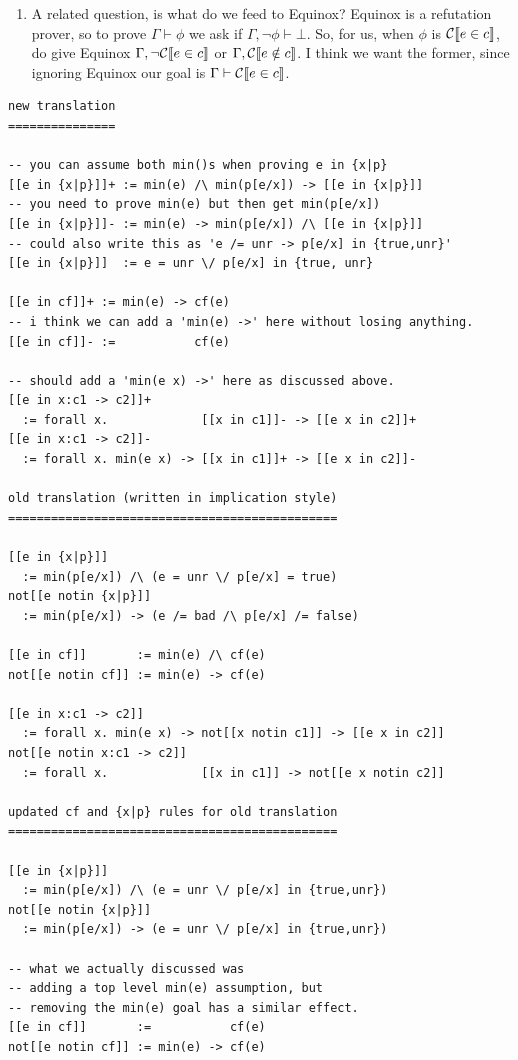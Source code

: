 \documentclass[preprint]{sigplanconf}
\begin{document}
{\begin{enumerate}
\item A related question, is what do we feed to Equinox?  Equinox is a 
  refutation prover, so to prove $\Gamma \vdash \phi$ we ask if 
  $\Gamma,\lnot \phi \vdash \bot$.  So, for us, when $\phi$ is $\mathcal{C} \llbracket e \in c \rrbracket$, do
  give Equinox $\Gamma,\lnot \mathcal{C} \llbracket e \in c \rrbracket$ or $\Gamma, \mathcal{C} \llbracket e \notin c \rrbracket$.  I think
  we want the former, since ignoring Equinox our goal is $\Gamma \vdash \mathcal{C} \llbracket e \in c \rrbracket$.
\end{enumerate}
}

\small
\begin{verbatim}
new translation
===============

-- you can assume both min()s when proving e in {x|p} 
[[e in {x|p}]]+ := min(e) /\ min(p[e/x]) -> [[e in {x|p}]]
-- you need to prove min(e) but then get min(p[e/x])
[[e in {x|p}]]- := min(e) -> min(p[e/x]) /\ [[e in {x|p}]]
-- could also write this as 'e /= unr -> p[e/x] in {true,unr}'
[[e in {x|p}]]  := e = unr \/ p[e/x] in {true, unr}

[[e in cf]]+ := min(e) -> cf(e)
-- i think we can add a 'min(e) ->' here without losing anything.
[[e in cf]]- :=           cf(e)

-- should add a 'min(e x) ->' here as discussed above.
[[e in x:c1 -> c2]]+
  := forall x.             [[x in c1]]- -> [[e x in c2]]+   
[[e in x:c1 -> c2]]-
  := forall x. min(e x) -> [[x in c1]]+ -> [[e x in c2]]-

old translation (written in implication style)
==============================================

[[e in {x|p}]]       
  := min(p[e/x]) /\ (e = unr \/ p[e/x] = true)
not[[e notin {x|p}]] 
  := min(p[e/x]) -> (e /= bad /\ p[e/x] /= false)

[[e in cf]]       := min(e) /\ cf(e)
not[[e notin cf]] := min(e) -> cf(e)

[[e in x:c1 -> c2]] 
  := forall x. min(e x) -> not[[x notin c1]] -> [[e x in c2]]
not[[e notin x:c1 -> c2]]
  := forall x.             [[x in c1]] -> not[[e x notin c2]]

updated cf and {x|p} rules for old translation
==============================================

[[e in {x|p}]]       
  := min(p[e/x]) /\ (e = unr \/ p[e/x] in {true,unr})
not[[e notin {x|p}]] 
  := min(p[e/x]) -> (e = unr \/ p[e/x] in {true,unr})

-- what we actually discussed was 
-- adding a top level min(e) assumption, but
-- removing the min(e) goal has a similar effect.
[[e in cf]]       :=           cf(e)
not[[e notin cf]] := min(e) -> cf(e)
\end{verbatim}
\end{document}
